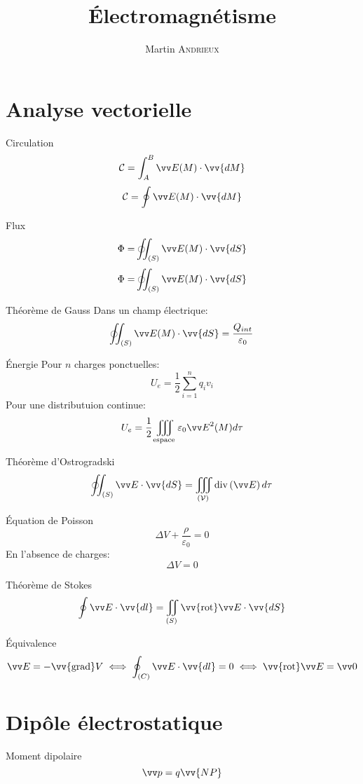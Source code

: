 \documentclass[french, a4paper, 11pt, twocolumn]{article}
\title{Électromagnétisme}
\author{Martin \textsc{Andrieux}}
\date{}
\newcommand{\inv}[1]{\dfrac{1}{#1}}
\newcommand{\po}{\left(}         %
\newcommand{\pf}{\right)}        %
\newcommand{\vect}[1]{\vv{#1}}
\newcommand{\grad}{\vect{\mathrm{grad}}}  %
\DeclareMathOperator{\diverg}{div}        %
\newcommand{\rota}{\vv{\mathrm{rot}}}    %
\newcommand{\ooint}{\ocircle\hspace{-3.65mm}\int\hspace{-2mm}\int}
\begin{document}
\maketitle

\section{Analyse vectorielle}
\begin{cadre}{Circulation}
  \[\mathcal C = \int_A^B \vv E(M)\cdot\vv{d M}\]
  \[\mathcal C = \oint \vv E(M)\cdot\vv{d M}\]
\end{cadre}

\begin{cadre}{Flux}
  \[\Phi = \ooint_{(S)} \vv E(M)\cdot\vv{d S}\]
  \[\Phi = \ooint_{(S)} \vv E(M)\cdot\vv{d S}\]
\end{cadre}

\begin{cadre}{Théorème de Gauss}
  Dans un champ électrique:
  \[\ooint_{(S)}\vv E(M)\cdot\vv{d S} = \dfrac{Q_{int}}{\varepsilon_{0}}\]
\end{cadre}

\begin{cadre}{Énergie}
  Pour \(n\) charges ponctuelles:
  \[U_{e} = \dfrac{1}{2}\sum_{i=1}^n q_{i}v_{i}\]
  Pour une distributuion continue:
  \[U_{e} = \inv{2}\iiint_{\text{espace}}\varepsilon_{0}{\vv E}^{2}(M) d\tau\]
\end{cadre}

\begin{cadre}{Théorème d'Ostrogradski}
  \[\ooint_{(S)}\vv E \cdot \vv{d S} = \iiint_{(\mathcal V)} \diverg\po\vv E\pf d\tau\]
\end{cadre}

\begin{cadre}{Équation de Poisson}
  \[\Delta V + \dfrac{\rho}{\varepsilon_{0}} = 0\]
  En l'absence de charges:
  \[\Delta V = 0\]
\end{cadre}

\begin{cadre}{Théorème de Stokes}
  \[\oint \vv E\cdot\vv{d l} = \iint_{(S)}\rota \vv E \cdot \vv{d S}\]
\end{cadre}

\begin{cadre}{Équivalence}
  \[\vv E = -\grad V \iff \oint_{(C)}\vv E\cdot \vv{d l} = 0 \iff \rota\vv E = \vv0\]
\end{cadre}

\section{Dipôle électrostatique}
\begin{cadre}{Moment dipolaire}
  \[\vv p = q \vv{NP}\]
\end{cadre}
\end{document}
